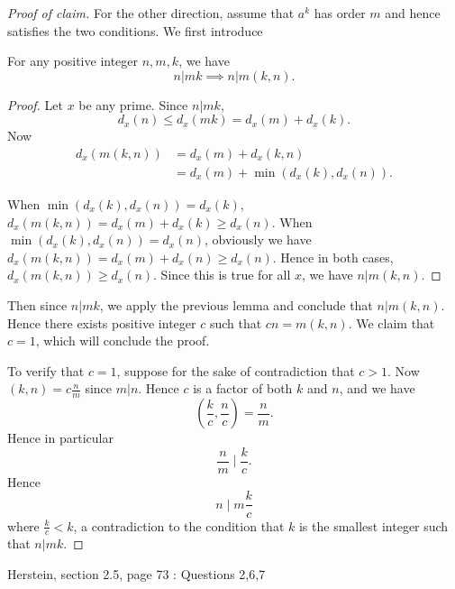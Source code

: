 \begin{enumerate}
\begin{proof}[\color{blue}Proof of claim]
	For the other direction, assume that $a^k$ has order $m$ and hence satisfies the two conditions. We first introduce
	\begin{lemma}
		For any positive integer $n,m,k$, we have \[
			n|mk \implies n|m(k,n) 
		.\] 
	\end{lemma}
	\begin{proof}
		Let $x$ be any prime. Since $n | mk$, 
		\[
			d_x(n) \le  d_x(mk) = d_x(m) + d_x(k)
		.\] 
		Now 
		\begin{align*}
			d_x(m (k,n)) &= d_x(m) + d_x(k,n)\\
			&= d_x(m) + \min(d_x(k), d_x(n)) 
		.\end{align*} 

		When $\min(d_x(k), d_x(n)) = d_x(k)$, $d_x(m (k,n)) = d_x(m) + d_x(k) \ge d_x(n)$. When $\min(d_x(k), d_x(n)) = d_x(n)$, obviously we have $d_x(m (k,n)) = d_x(m) + d_x(n) \ge  d_x(n)$. Hence in both cases, $d_x(m (k,n)) \ge d_x (n)$. Since this is true for all $x$, we have  $n | m(k,n)$.
	\end{proof}
	

	Then since $n | mk$, we apply the previous lemma and conclude that $n | m(k,n) $. Hence there exists positive integer $c$ such that $cn = m(k,n) $. We claim that $c = 1$, which will conclude the proof.

	To verify that $c=1$, suppose for the sake of contradiction that $c > 1$. Now $(k,n) = c \frac{n}{m}$ since $m | n$. Hence  $c$ is a factor of both $k$ and $n$, and we have \[
		\left( \frac{k}{c}, \frac{n}{c} \right) = \frac{n}{m}
	.\] 
	Hence in particular \[
		\frac{n}{m} \mid \frac{k}{c}
	.\] 
	Hence \[
		n \mid m \frac{k}{c} 
	\]
	where $\frac{k}{c}<k$, a contradiction to the condition that $k$ is the smallest integer such that $n | mk$.
\end{proof}


\end{enumerate}
Herstein, section 2.5, page 73 : Questions 2,6,7
